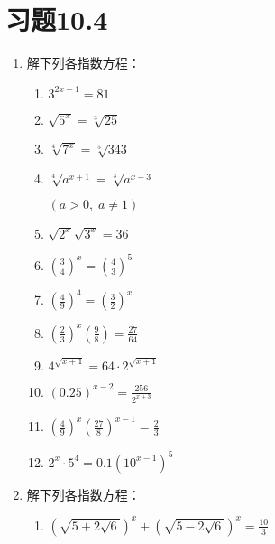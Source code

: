 \section*{习题10.4}
\begin{enumerate}
  \item 解下列各指数方程：
\begin{multicols}{2}
\begin{enumerate}
\item $3^{2 x-1}=81$
\item $\sqrt{5^{x}}=\sqrt[3]{25}$
\item  $\sqrt[4]{7^{x}}=\sqrt[5]{343}$
\item $\sqrt[4]{a^{x+1}}=\sqrt[3]{a^{x-3}}$

$(a>0,\;  a \neq 1)$
\item  $\sqrt{2^{x}} \sqrt{3^{x}}=36$
\item $\left(\frac{3}{4}\right)^x=\left(\frac{4}{3}\right)^5$
  \item $\left(\frac{4}{9}\right)^{4}=\left(\frac{3}{2}\right)^{x}$
  \item $\left(\frac{2}{3}\right)^{x}\left(\frac{9}{8}\right)=\frac{27}{64}$
  \item $ 4^{\sqrt{x+1}}=64 \cdot 2^{\sqrt{x+1}} $
  \item $(0.25)^{x-2}=\frac{256}{2^{x+3}}$
  \item  $\left(\frac{4}{9}\right)^{x}\left(\frac{27}{8}\right)^{x-1}=\frac{2}{3}$
  \item  $2^{x} \cdot 5^{4}=0.1\left(10^{x-1}\right)^{5}$
\end{enumerate}
\end{multicols}


\item  解下列各指数方程：
\begin{enumerate}
\item   $\left(\sqrt{5+2 \sqrt{6}}\right)^{x}+\left(\sqrt{5-2 \sqrt{6}}\right)^{x}=\frac{10}{3}$
\end{enumerate}



\end{enumerate}
